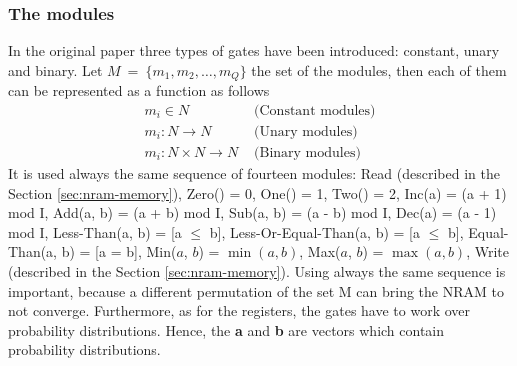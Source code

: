 \subsubsection*{The modules}
In the original paper three types of gates have been introduced: constant, unary and binary. Let $M\ =\ \{m_1, m_2, \dots, m_Q \}$ the set of the modules, then each of them can be represented as a function as follows
\begin{align}
		m_i \in N & \textrm{ (Constant modules)} \\
		m_i: N \rightarrow N & \textrm{ (Unary modules)} \\
		m_i: N \times N \rightarrow N & \textrm{ (Binary modules)}
\end{align}
It is used always the same sequence of fourteen modules: Read (described in the Section \ref{sec:nram-memory}), Zero() = 0, One() = 1, Two() = 2, Inc(a) = (a + 1) mod I, Add(a, b) = (a + b) mod I, Sub(a, b) = (a - b) mod I, Dec(a) = (a - 1) mod I, Less-Than(a, b) = [a $\le$ b], Less-Or-Equal-Than(a, b) = [a $\leq$ b], Equal-Than(a, b) = [a = b], Min($a$, $b$) = $\min(a, b)$, Max($a$, $b$) = $\max(a, b)$, Write (described in the Section \ref{sec:nram-memory}). Using always the same sequence is important, because a different permutation of the set M can bring the NRAM to not converge. Furthermore, as for the registers, the gates have to work over probability distributions. Hence, the \textbf{a} and \textbf{b} are vectors which contain probability distributions.

